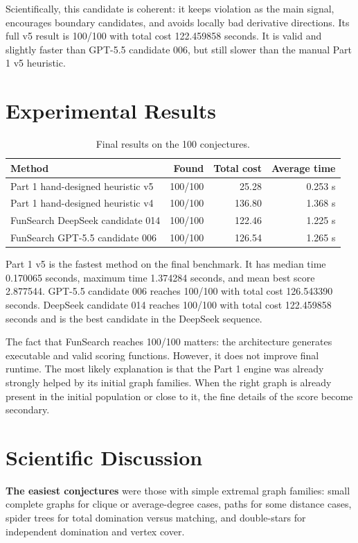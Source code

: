 \documentclass[11pt,a4paper]{article}
\begin{document}
Scientifically, this candidate is coherent: it keeps violation as the main signal, encourages boundary candidates, and avoids locally bad derivative directions. Its full v5 result is 100/100 with total cost 122.459858 seconds. It is valid and slightly faster than GPT-5.5 candidate 006, but still slower than the manual Part 1 v5 heuristic.

\section{Experimental Results}

\begin{table}[H]
\centering
\begin{tabular}{lrrr}
\toprule
Method & Found & Total cost & Average time \\
\midrule
Part 1 hand-designed heuristic v5 & 100/100 & 25.28 & 0.253 s \\
Part 1 hand-designed heuristic v4 & 100/100 & 136.80 & 1.368 s \\
FunSearch DeepSeek candidate 014 & 100/100 & 122.46 & 1.225 s \\
FunSearch GPT-5.5 candidate 006 & 100/100 & 126.54 & 1.265 s \\
\bottomrule
\end{tabular}
\caption{Final results on the 100 conjectures.}
\end{table}

Part 1 v5 is the fastest method on the final benchmark. It has median time 0.170065 seconds, maximum time 1.374284 seconds, and mean best score 2.877544. GPT-5.5 candidate 006 reaches 100/100 with total cost 126.543390 seconds. DeepSeek candidate 014 reaches 100/100 with total cost 122.459858 seconds and is the best candidate in the DeepSeek sequence.

The fact that FunSearch reaches 100/100 matters: the architecture generates executable and valid scoring functions. However, it does not improve final runtime. The most likely explanation is that the Part 1 engine was already strongly helped by its initial graph families. When the right graph is already present in the initial population or close to it, the fine details of the score become secondary.

\section{Scientific Discussion}

\textbf{The easiest conjectures} were those with simple extremal graph families: small complete graphs for clique or average-degree cases, paths for some distance cases, spider trees for total domination versus matching, and double-stars for independent domination and vertex cover.
\end{document}

